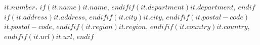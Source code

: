 \textbf{$it.number$.} $if(it.name)$$it.name$, $endif$$if(it.department)$$it.department$, $endif$$if(it.address)$$it.address$, $endif$$if(it.city)$$it.city$, $endif$$if(it.postal-code)$$it.postal-code$, $endif$$if(it.region)$$it.region$, $endif$$if(it.country)$$it.country$, $endif$$if(it.url)$$it.url$, $endif$
